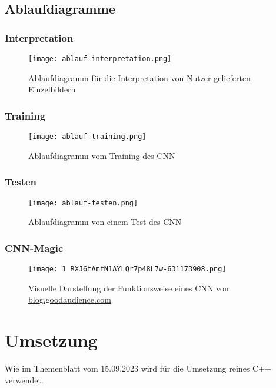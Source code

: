 \subsection{Ablaufdiagramme}
\label{sec:AnalyseAblaufdiagramme}

\subsubsection{Interpretation}
\label{sec:AnalyseInterpretation}
\begin{figure}[H]
\centering
\texttt{[image: ablauf-interpretation.png]}
\caption{Ablaufdiagramm für die Interpretation von Nutzer-gelieferten Einzelbildern}
\label{fig:analyseablauf-interpretation}
\end{figure}


\subsubsection{Training}
\label{sec:AnalyseTraining}
\begin{figure}[H]
\centering
\texttt{[image: ablauf-training.png]}
\caption{Ablaufdiagramm vom Training des CNN}
\label{fig:analyseablauf-training}
\end{figure}


\subsubsection{Testen}
\label{sec:AnalyseTesten}
\begin{figure}[H]
\centering
\texttt{[image: ablauf-testen.png]}
\caption{Ablaufdiagramm von einem Test des CNN}
\label{fig:analyseablauf-testen}
\end{figure}


\subsubsection{CNN-Magic}
\label{sec:AnalyseCNN-Magic}
\begin{figure}[H]
\centering
\texttt{[image: 1 RXJ6tAmfN1AYLQr7p48L7w-631173908.png]}
\caption{Visuelle Darstellung der Funktionsweise eines CNN von \href{https://blog.goodaudience.com/cnn-for-rnns-a-gentle-approach-to-use-cnns-for-nlp-53ab80768d43}{blog.goodaudience.com}}
\label{fig:analyse1RXJ6tAmfN1AYLQr7p48L7w-631173908}
\end{figure}

\section{Umsetzung}
\label{sec:AnalyseUmsetzung}
Wie im Themenblatt vom 15.09.2023 wird für die Umsetzung reines C++ verwendet.

